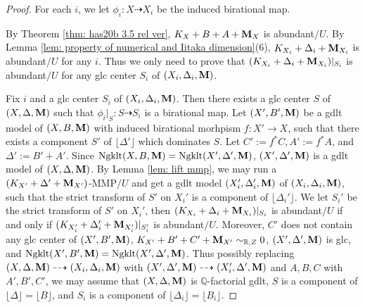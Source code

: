 \documentclass[11pt]{amsart}
\numberwithin{equation}{section}
\newcommand{\Mm}{{\bf{M}}}
\newcommand{\Qq}{\mathbb{Q}}
\newcommand{\Rr}{\mathbb{R}}
\newcommand{\Ngklt}{\operatorname{Ngklt}}
\theoremstyle{definition}
\theoremstyle{definition}
\theoremstyle{definition}
\begin{document}
\begin{proof}
For each $i$, we let $\phi_i: X\dashrightarrow X_i$ be the induced birational map. 

By Theorem \ref{thm: has20b 3.5 rel ver}, $K_{X}+B+A+\Mm_{X}$ is abundant$/U$. By Lemma \ref{lem: property of numerical and Iitaka dimension}(6), $K_{X_{i}}+\Delta_{i}+\Mm_{X_{i}}$ is abundant$/U$ for any $i$. Thus we only need to prove that $(K_{X_i}+\Delta_i+\Mm_{X_i})|_{S_i}$ is abundant$/U$ for any glc center $S_i$ of $(X_i,\Delta_i,\Mm)$.

Fix $i$ and a glc center $S_i$ of $(X_i,\Delta_i,\Mm)$. Then there exists a glc center $S$ of $(X,\Delta,\Mm)$ such that $\phi_i|_S: S\dashrightarrow S_i$ is a birational map. Let $(X',B',\Mm)$ be a gdlt model of $(X,B,\Mm)$ with induced birational morhpism $f: X'\rightarrow X$, such that there exists a component $S'$ of $\lfloor\Delta'\rfloor$ which dominates $S$. Let $C':=f^*C,A':=f^*A$, and $\Delta':=B'+A'$. Since $\Ngklt(X,B,\Mm)=\Ngklt(X',\Delta',\Mm)$, $(X',\Delta',\Mm)$ is a gdlt model of $(X,\Delta,\Mm)$. By Lemma \ref{lem: lift mmp}, we may run a $(K_{X'}+\Delta'+\Mm_{X'})$-MMP$/U$ and get a gdlt model $(X_i',\Delta_i',\Mm)$ of $(X_i,\Delta_i,\Mm)$, such that the strict transform of $S'$ on $X_i'$ is a component of $\lfloor\Delta_i'\rfloor$. We let $S_i'$ be the strict transform of $S'$ on $X_i'$, then $(K_{X_i}+\Delta_i+\Mm_{X_i})|_{S_i}$ is abundant$/U$ if and only if $(K_{X'_i}+\Delta'_i+\Mm_{X'_i})|_{S'_i}$ is abundant$/U$. Moreover, $C'$ does not contain any glc center of $(X',B',\Mm)$, $K_{X'}+B'+C'+\Mm_{X'}\sim_{\Rr,Z}0$, $(X',\Delta',\Mm)$ is glc, and $\Ngklt(X',B',\Mm)=\Ngklt(X',\Delta',\Mm)$. Thus possibly replacing $(X,\Delta,\Mm)\dashrightarrow (X_i,\Delta_i,\Mm)$ with $(X',\Delta',\Mm)\dashrightarrow (X'_i,\Delta',\Mm)$ and $A,B,C$ with $A',B',C'$, we may assume that $(X,\Delta,\Mm)$ is $\Qq$-factorial gdlt, $S$ is a component of $\lfloor\Delta\rfloor=\lfloor B\rfloor$, and $S_i$ is a component of $\lfloor\Delta_i\rfloor=\lfloor B_i\rfloor$.


\end{proof}
\end{document}
